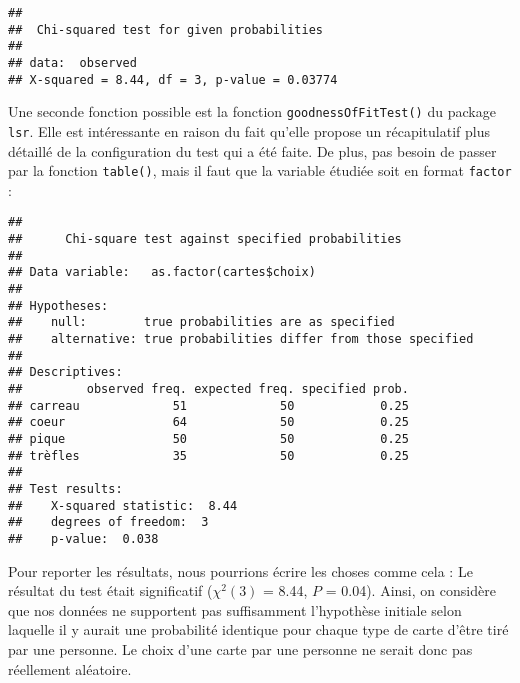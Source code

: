 \documentclass[
]{book}
\newenvironment{Shaded}{\begin{snugshade}}{\end{snugshade}}
\newcommand{\AttributeTok}[1]{\textcolor[rgb]{0.77,0.63,0.00}{#1}}
\newcommand{\FloatTok}[1]{\textcolor[rgb]{0.00,0.00,0.81}{#1}}
\newcommand{\FunctionTok}[1]{\textcolor[rgb]{0.00,0.00,0.00}{#1}}
\newcommand{\NormalTok}[1]{#1}
\newcommand{\SpecialCharTok}[1]{\textcolor[rgb]{0.00,0.00,0.00}{#1}}
\begin{document}
\begin{verbatim}
## 
##  Chi-squared test for given probabilities
## 
## data:  observed
## X-squared = 8.44, df = 3, p-value = 0.03774
\end{verbatim}

Une seconde fonction possible est la fonction \texttt{goodnessOfFitTest()} du package \texttt{lsr}. Elle est intéressante en raison du fait qu'elle propose un récapitulatif plus détaillé de la configuration du test qui a été faite. De plus, pas besoin de passer par la fonction \texttt{table()}, mais il faut que la variable étudiée soit en format \texttt{factor} :

\begin{Shaded}
\end{Shaded}

\begin{verbatim}
## 
##      Chi-square test against specified probabilities
## 
## Data variable:   as.factor(cartes$choix) 
## 
## Hypotheses: 
##    null:        true probabilities are as specified
##    alternative: true probabilities differ from those specified
## 
## Descriptives: 
##         observed freq. expected freq. specified prob.
## carreau             51             50            0.25
## coeur               64             50            0.25
## pique               50             50            0.25
## trèfles             35             50            0.25
## 
## Test results: 
##    X-squared statistic:  8.44 
##    degrees of freedom:  3 
##    p-value:  0.038
\end{verbatim}

Pour reporter les résultats, nous pourrions écrire les choses comme cela \autocite{navarroLearningStatistics2018} : Le résultat du test était significatif (\(\chi^2(3)\) = 8.44, \(P\) = 0.04). Ainsi, on considère que nos données ne supportent pas suffisamment l'hypothèse initiale selon laquelle il y aurait une probabilité identique pour chaque type de carte d'être tiré par une personne. Le choix d'une carte par une personne ne serait donc pas réellement aléatoire.
\end{document}
